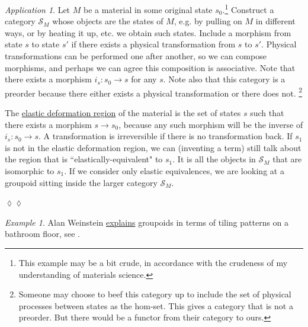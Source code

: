 \documentclass{book}
\def\mc{\mathcal}
\def\to{\rightarrow}
\def\taking{\colon}
\def\mcS{\mc{S}}
\theoremstyle{remark}
\newtheorem{example}[subsubsection]{Example}
\newtheorem{app}[subsubsection]{Application}
\newenvironment{application}{\begin{app}}{\hspace*{\fill}$\lozenge\lozenge$\end{app}}
\theoremstyle{definition}
\begin{document}
\begin{application}

Let $M$ be a material in some original state $s_0$.\footnote{This example may be a bit crude, in accordance with the crudeness of my understanding of materials science.} Construct a category $\mcS_M$ whose objects are the states of $M$, e.g. by pulling on $M$ in different ways, or by heating it up, etc. we obtain such states. Include a morphism from state $s$ to state $s'$ if there exists a physical transformation from $s$ to $s'$. Physical transformations can be performed one after another, so we can compose morphisms, and perhaps we can agree this composition is associative. Note that there exists a morphism $i_s\taking s_0\to s$ for any $s$. Note also that this category is a preorder because there either exists a physical transformation or there does not. 
\footnote{Someone may choose to beef this category up to include the set of physical processes between states as the hom-set. This gives a category that is not a preorder. But there would be a functor from their category to ours.}

The \href{http://en.wikipedia.org/wiki/Elastic_modulus}{\text elastic deformation region} of the material is the set of states $s$ such that there exists a morphism $s\to s_0$, because any such morphism will be the inverse of $i_s\taking s_0\to s$. A transformation is irreversible if there is no transformation back. If $s_1$ is not in the elastic deformation region, we can (inventing a term) still talk about the region that is ``elastically-equivalent" to $s_1$. It is all the objects in $\mcS_M$ that are isomorphic to $s_1$. If we consider only elastic equivalences, we are looking at a groupoid sitting inside the larger category $\mcS_M$.

\end{application}

\begin{example}

Alan Weinstein \href{http://www.ams.org/notices/199607/weinstein.pdf}{\text explains} groupoids in terms of tiling patterns on a bathroom floor, see \cite{WeA}.

\end{example}
\end{document}
